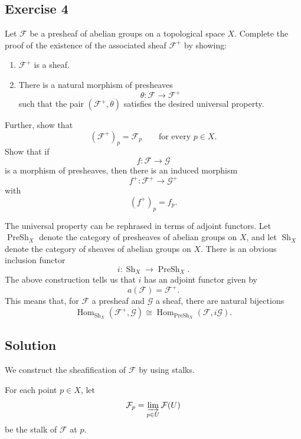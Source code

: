 
\subsection*{Exercise 4}

Let $\mathcal F$ be a presheaf of abelian groups on a topological space $X$.
Complete the proof of the existence of the associated sheaf $\mathcal F^+$
by showing:

\begin{enumerate}
	\item $\mathcal F^+$ is a sheaf.
	\item There is a natural morphism of presheaves
	\[
	\theta : \mathcal F \longrightarrow \mathcal F^+
	\]
	such that the pair $(\mathcal F^+,\theta)$ satisfies the desired universal property.
\end{enumerate}

Further, show that
\[
(\mathcal F^+)_p = \mathcal F_p
\qquad \text{for every } p \in X.
\]
Show that if
\[
f : \mathcal F \longrightarrow \mathcal G
\]
is a morphism of presheaves, then there is an induced morphism
\[
f^+ : \mathcal F^+ \longrightarrow \mathcal G^+
\]
with
\[
(f^+)_p = f_p.
\]

The universal property can be rephrased in terms of adjoint functors. Let
$\operatorname{PreSh}_X$ denote the category of presheaves of abelian groups on
$X$, and let $\operatorname{Sh}_X$ denote the category of sheaves of abelian
groups on $X$. There is an obvious inclusion functor
\[
i : \operatorname{Sh}_X \longrightarrow \operatorname{PreSh}_X.
\]
The above construction tells us that $i$ has an adjoint functor given by
\[
a(\mathcal F) = \mathcal F^+.
\]
This means that, for $\mathcal F$ a presheaf and $\mathcal G$ a sheaf, there
are natural bijections
\[
\operatorname{Hom}_{\operatorname{Sh}_X}(\mathcal F^+,\mathcal G)
\cong
\operatorname{Hom}_{\operatorname{PreSh}_X}(\mathcal F,i\mathcal G).
\]

\subsection*{Solution}

We construct the sheafification of $\mathcal F$ by using stalks.

For each point $p \in X$, let
\[
\mathcal F_p
=
\varinjlim_{p \in U} \mathcal F(U)
\]
be the stalk of $\mathcal F$ at $p$.

